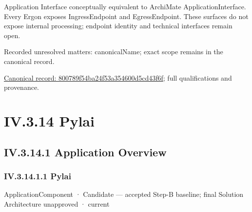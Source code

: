 Application Interface conceptually equivalent to ArchiMate ApplicationInterface.
Every Ergon exposes IngressEndpoint and EgressEndpoint. These surfaces do not
expose internal processing; endpoint identity and technical interfaces remain open.


{\small Recorded unresolved matters: canonicalName; exact scope remains in the canonical record.}\par
{\footnotesize \href{../../../../continuum/application/application-interface/800789f54ba24f53a354600d5cd43f6f.md}{Canonical record: 800789f54ba24f53a354600d5cd43f6f}; full qualifications and provenance.}\par
\section*{IV.3.14 Pylai}
\label{navigation:IV.3.14}

\subsection*{IV.3.14.1 Application Overview}
\label{navigation:IV.3.14.1}

\subsubsection*{IV.3.14.1.1 Pylai}
\label{navigation:IV.3.14.1.1}

\label{element:e3e4147fea3640198dc251ed41ee854d}
{\small ApplicationComponent · Candidate — accepted Step-B baseline; final Solution Architecture unapproved · current}\par

